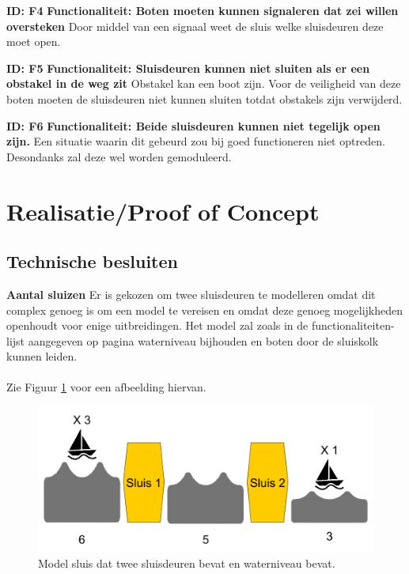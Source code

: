 \documentclass{article}
\begin{document}
\textbf{ID: F4} \newline
\textbf{Functionaliteit: Boten moeten kunnen signaleren dat zei willen oversteken} \newline
Door middel van een signaal weet de sluis welke sluisdeuren deze moet open. \newline

\textbf{ID: F5} \newline
\textbf{Functionaliteit: Sluisdeuren kunnen niet sluiten als er een obstakel in de weg zit} \newline
Obstakel kan een boot zijn. Voor de veiligheid van deze boten moeten de sluisdeuren niet kunnen sluiten totdat obstakels zijn verwijderd.  \newline

\textbf{ID: F6} \newline
\textbf{Functionaliteit: Beide sluisdeuren kunnen niet tegelijk open zijn.} \newline
Een situatie waarin dit gebeurd zou bij goed functioneren niet optreden. Desondanks zal deze wel worden gemoduleerd. \newline


\section{Realisatie/Proof of Concept}

\subsection{Technische besluiten}
\textbf{Aantal sluizen}\newline
Er is gekozen om twee sluisdeuren te modelleren omdat dit complex genoeg is om een model te vereisen en omdat deze genoeg mogelijkheden openhoudt voor enige uitbreidingen. Het model zal zoals in de functionaliteiten-lijst aangegeven op pagina \pageref{sec:FuncList} waterniveau bijhouden en boten door de sluiskolk kunnen leiden.\\\\
Zie Figuur \ref{fig:sluiceWaterLv} voor een afbeelding hiervan. 
\begin{figure}[!h]
	\centering
	\includegraphics[width=\textwidth]{images/sluis_model.png}
    \caption{Model sluis dat twee sluisdeuren bevat en waterniveau bevat.}
	\label{fig:sluiceWaterLv}
\end{figure}
\end{document}
